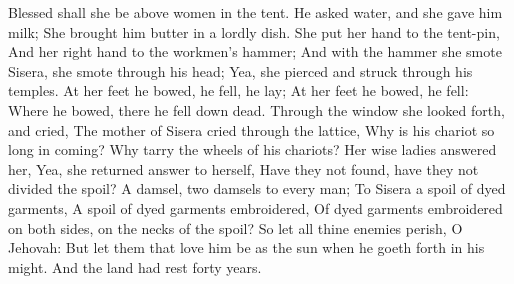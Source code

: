 Blessed shall she be above women in the tent.  He asked water, and she gave him milk; She brought him butter in a lordly dish.  She put her hand to the tent-pin, And her right hand to the workmen’s hammer; And with the hammer she smote Sisera, she smote through his head; Yea, she pierced and struck through his temples.  At her feet he bowed, he fell, he lay; At her feet he bowed, he fell: Where he bowed, there he fell down dead.  Through the window she looked forth, and cried, The mother of Sisera cried through the lattice, Why is his chariot so long in coming? Why tarry the wheels of his chariots?  Her wise ladies answered her, Yea, she returned answer to herself,  Have they not found, have they not divided the spoil? A damsel, two damsels to every man; To Sisera a spoil of dyed garments, A spoil of dyed garments embroidered, Of dyed garments embroidered on both sides, on the necks of the spoil?  So let all thine enemies perish, O Jehovah: But let them that love him be as the sun when he goeth forth in his might. And the land had rest forty years. 


